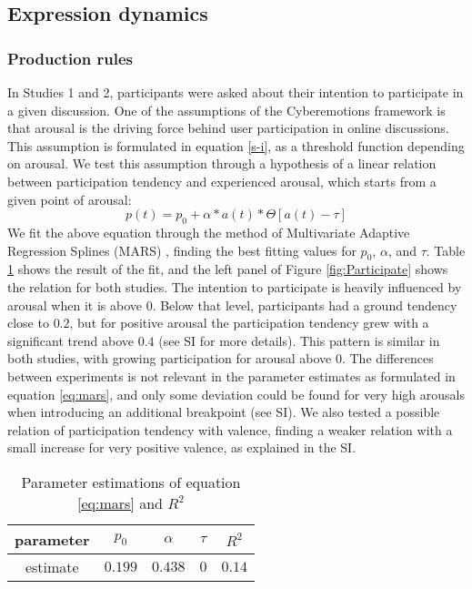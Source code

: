 \documentclass[nologo,url,11pt,a4paper]{ETHpaper}
\begin{document}
\subsection{Expression dynamics}




\subsubsection{Production rules}

In Studies 1 and 2, participants were asked about their intention to
participate in a given discussion. One of the assumptions of the Cyberemotions
framework is that arousal is the driving force behind user participation in
online discussions.  This assumption is formulated in equation \ref{s-i}, as a
threshold function depending on arousal. We test this assumption through a
hypothesis of a  linear relation between participation tendency and
experienced arousal, which starts from a given point of arousal:
\begin{equation}
\label{eq:mars}
p(t) = p_0 + \alpha * a(t) * \Theta[a(t) - \tau]
\end{equation}
We fit the above equation through  the method of Multivariate Adaptive
Regression Splines (MARS) \cite{Friedman1991}, finding  the best fitting
values for  $p_0$, $\alpha$, and $\tau$. Table \ref{tab:Amars} shows the
result of the fit, and the left panel of  Figure \ref{fig:Participate} shows
the relation for both studies.  The intention to participate is heavily
influenced by arousal when it is above $0$. Below that level, participants had
a ground tendency  close to $0.2$, but for positive arousal the participation
tendency grew with a significant trend above $0.4$ (see SI for more details).
This pattern is similar in both studies, with growing participation for
arousal above $0$. The differences between experiments is not relevant in the
parameter estimates as  formulated in equation \ref{eq:mars}, and only some
deviation could be found for very high arousals when introducing an additional
breakpoint (see SI). We also tested a possible relation of participation
tendency with valence, finding a weaker relation with a small increase for
very positive valence, as explained in the SI.

\begin{table}[h]
\centering
\begin{tabular}{ c | c  c  c  | c }
parameter & $p_0$   & $\alpha$  & $\tau$ & $R^2$ \\ \hline
estimate  & $0.199$ & $0.438$   & $0$    & $0.14$
\end{tabular}
\caption[Participation MARS results]{Parameter estimations of equation \ref{eq:mars} and $R^2$
\label{tab:Amars}}
\end{table}
\end{document}
